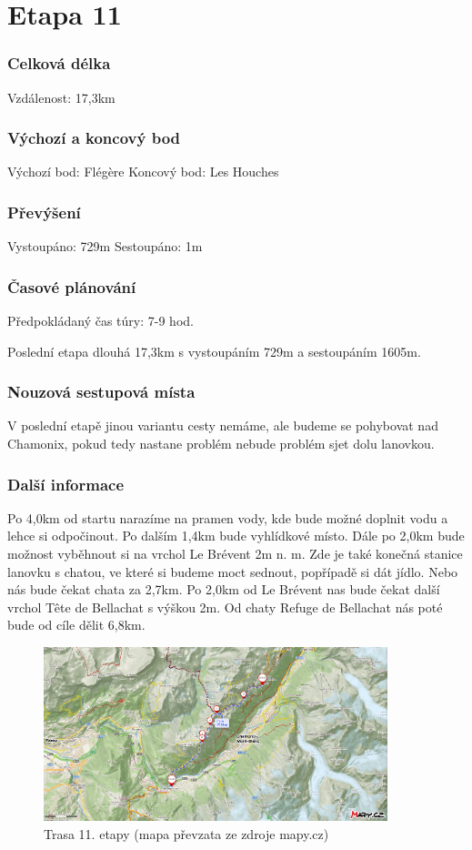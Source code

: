 \section{Etapa 11}
\subsubsection*{Celková délka}
\noindent Vzdálenost: 17,3\:km
\subsubsection*{Výchozí a koncový bod}
\noindent Výchozí bod: Flégère
\noindent Koncový bod: Les Houches
\subsubsection*{Převýšení}
\noindent Vystoupáno: 729\:m
\noindent Sestoupáno: 1\:m
\subsubsection*{Časové plánování}
\noindent Předpokládaný čas túry: 7-9 hod.

Poslední etapa dlouhá 17,3\:km s vystoupáním 729\:m a sestoupáním 1605\:m.
\subsubsection*{Nouzová sestupová místa}
V poslední etapě jinou variantu cesty nemáme, ale budeme se pohybovat nad Chamonix, pokud tedy nastane problém nebude problém sjet dolu lanovkou.
\subsubsection*{Další informace}
Po 4,0\:km od startu narazíme na pramen vody, kde bude možné doplnit vodu a lehce si odpočinout. Po dalším 1,4\:km bude vyhlídkové místo. Dále po 2,0\:km bude možnost vyběhnout si na vrchol Le Brévent 2\:m n. m. Zde je také konečná stanice lanovku s chatou, ve které si budeme moct sednout, popřípadě si dát jídlo. Nebo nás bude čekat chata za 2,7\:km. Po 2,0\:km od Le Brévent nas bude čekat další vrchol Tête de Bellachat s výškou 2\:m. Od chaty Refuge de Bellachat nás poté bude od cíle dělit 6,8\:km. 
\begin{figure}[!hbt]
    \centering
    \includegraphics[width=10.0cm]{Figures/day_11.png}
    \caption[Trasa: den jedenáctý]{Trasa 11. etapy (mapa převzata ze zdroje mapy.cz)}
    \label{Obr:day_11}
\end{figure} 
